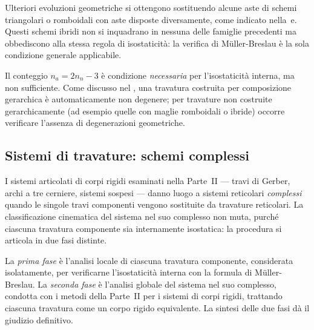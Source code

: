 Ulteriori evoluzioni geometriche si ottengono
sostituendo alcune aste di schemi triangolari o
romboidali con aste disposte diversamente, come
indicato nella \,e.
Questi schemi ibridi non si inquadrano in nessuna
delle famiglie precedenti ma obbediscono alla stessa
regola di isostaticità: la verifica di M\"{u}ller-Breslau
è la sola condizione generale applicabile.



\begin{oss}
	Il conteggio $n_a = 2n_n - 3$ è condizione
	\emph{necessaria} per l'isostaticità interna,
	ma non sufficiente. Come discusso nel
	,
	una travatura costruita per composizione
	gerarchica è automaticamente non degenere;
	per travature non costruite gerarchicamente
	(ad esempio quelle con maglie romboidali
	o ibride) occorre verificare l'assenza di
	degenerazioni geometriche.
\end{oss}


\subsection{Sistemi di travature: schemi complessi}
\label{subsec:sistemi_travature}

I sistemi articolati di corpi rigidi esaminati nella
Parte~II --- travi di Gerber, archi a tre cerniere,
sistemi sospesi --- danno luogo a sistemi reticolari
\emph{complessi} quando le singole travi componenti
vengono sostituite da travature reticolari. La
classificazione cinematica del sistema nel suo
complesso non muta, purché ciascuna travatura
componente sia internamente isostatica: la procedura
si articola in due fasi distinte.

La \emph{prima fase} è l'analisi locale di ciascuna
travatura componente, considerata isolatamente,
per verificarne l'isostaticità interna con la formula
di M\"{u}ller-Breslau. La \emph{seconda fase} è l'analisi
globale del sistema nel suo complesso, condotta con
i metodi della Parte~II per i sistemi di corpi rigidi,
trattando ciascuna travatura come un corpo rigido
equivalente. La sintesi delle due fasi dà il giudizio
definitivo.



